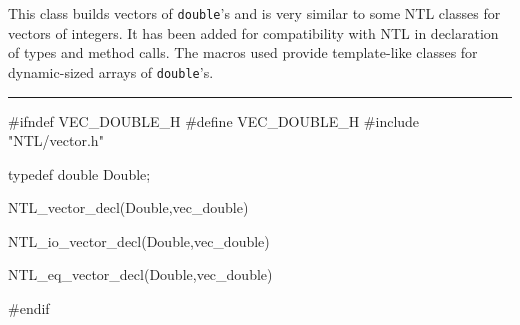 % 
% 
% 
% 


This class builds vectors of \texttt{double}'s and is very similar to some NTL
classes for vectors of integers. It has been added for compatibility with NTL in 
declaration of types and method calls. The macros used provide template-like
classes for dynamic-sized arrays of \texttt{double}'s.



\bigskip\hrule
\code \hide
#ifndef VEC_DOUBLE_H
#define VEC_DOUBLE_H
\endhide
#include "NTL/vector.h"

typedef double Double; 

NTL_vector_decl(Double,vec_double)

NTL_io_vector_decl(Double,vec_double)

NTL_eq_vector_decl(Double,vec_double)

\hide
#endif
\endhide
\endcode
